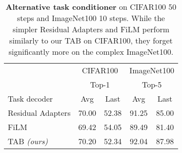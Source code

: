 \begin{table}[t]
    \centering
    \begin{tabular}{@{}l|cc|cc@{}}
        \hline
                            & \multicolumn{2}{c}{CIFAR100} & \multicolumn{2}{c}{ImageNet100}
        \\
                            & \multicolumn{2}{c}{Top-1}    & \multicolumn{2}{c}{Top-5}
        \\
        Task decoder        & Avg                          & Last                            & Avg   & Last  \\
        \hline
        Residual Adapters   & 70.00                        & 52.38                           & 91.25 & 85.00 \\
        FiLM                & 69.42                        & 54.05                           & 89.49 & 81.40 \\
        TAB \textit{(ours)} & 70.20                        & 52.34                           & 92.04 & 87.98 \\
        \hline
    \end{tabular}
    \caption{\textbf{Alternative task conditioner} on CIFAR100 50 steps and ImageNet100 10 steps.
        While the simpler Residual Adapters \citep{rebuffi2017residualadapters} and FiLM
        \citep{perez2018film} perform similarly to our TAB on CIFAR100, they forget
        significantly more on the complex ImageNet100.}
    \label{tab:dytox_task_cond}
\end{table}
